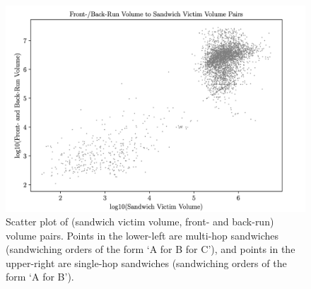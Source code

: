         

        \begin{figure}
            \centering
            \includegraphics[scale=.33]{figs/meat-and-bun-pairwise-plots.png}
            \caption{Scatter plot of (sandwich victim volume, front- and back-run) volume pairs. Points in the lower-left are multi-hop sandwiches (sandwiching orders of the form `A for B for C'), and points in the upper-right are single-hop sandwiches (sandwiching orders of the form `A for B').
            }
            \label{fig:meat-bun-pairplots}
        \end{figure}

        

